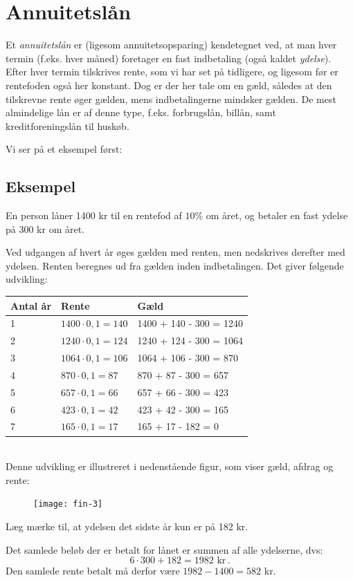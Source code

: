\documentclass[12pt,oneside,a4paper]{article}
\begin{document}
\section{Annuitetslån}
Et \emph{annuitetslån} er (ligesom annuitetsopsparing) kendetegnet ved, at man
hver termin (f.eks. hver måned) foretager en fast indbetaling (også kaldet
\emph{ydelse}). Efter hver termin tilskrives rente, som vi har set på
tidligere, og ligesom før er rentefoden også her konstant. Dog er der her tale
om en gæld, således at den tilskrevne rente øger gælden, mens indbetalingerne
mindsker gælden.  De mest almindelige lån er af denne type, f.eks. forbrugslån,
billån, samt kreditforeningslån til huskøb.

Vi ser på et eksempel først:
\begin{tcolorbox}
\subsection*{Eksempel}
En person låner 1400 kr til en rentefod af $10\%$ om året, og betaler en fast
ydelse på 300 kr om året.

Ved udgangen af hvert år øges gælden med renten, men nedskrives derefter med
ydelsen. Renten beregnes ud fra gælden inden indbetalingen.  Det giver
følgende udvikling:
\\

\begin{tabular}{|l|l|l|}
    \hline
    \textbf{Antal år} & \textbf{Rente} & \textbf{Gæld} \\
    \hline
    1 & $1400\cdot 0,1 = 140$ & 1400 + 140 - 300 = 1240 \\
    \hline
    2 & $1240\cdot 0,1 = 124$ & 1240 + 124 - 300 = 1064 \\
    \hline
    3 & $1064\cdot 0,1 = 106$ & 1064 + 106 - 300 =  870 \\
    \hline
    4 & $870\cdot 0,1 = 87$ & 870 + 87 - 300 = 657 \\
    \hline
    5 & $657\cdot 0,1 = 66$ & 657 + 66 - 300 = 423 \\
    \hline
    6 & $423\cdot 0,1 = 42$ & 423 + 42 - 300 = 165 \\
    \hline
    7 & $165\cdot 0,1 = 17$ & 165 + 17 - 182 = 0 \\
    \hline
\end{tabular}
\\

Denne udvikling er illustreret i nedenstående figur, som viser gæld, afdrag og rente:
\begin{figure}[H]
    \centering
    \texttt{[image: fin-3]}
\end{figure}

Læg mærke til, at ydelsen det sidste år kun er på 182 kr.

Det samlede beløb der er betalt for lånet er summen af alle ydelserne, dvs:
\[
6\cdot 300 + 182 = 1982 \,\,\mbox{kr}\,.
\]
Den samlede rente betalt må derfor være $1982 - 1400 = 582$ kr.

\end{tcolorbox}
\end{document}
